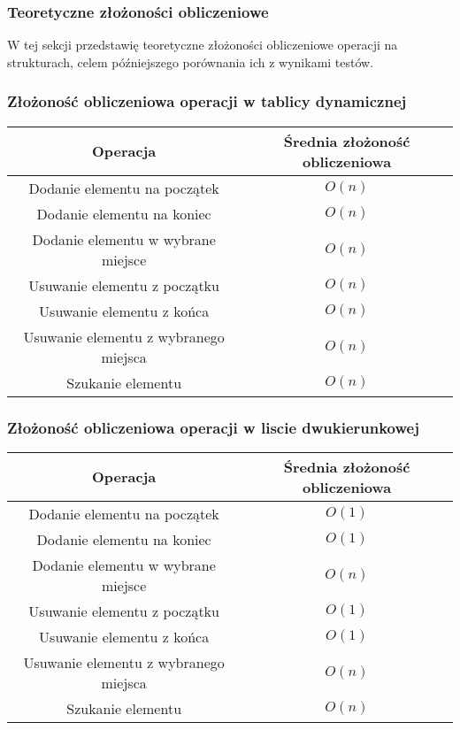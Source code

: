 \documentclass{article}
\begin{document}
        \subsubsection{Teoretyczne złożoności obliczeniowe}
        W tej sekcji przedstawię teoretyczne złożoności obliczeniowe operacji na strukturach, celem późniejszego porównania ich z wynikami testów.
        \subsubsection{Złożoność obliczeniowa operacji w tablicy dynamicznej}
        \begin{center}    
            \begin{tabular}[H]{| c | c |}
                \hline
                Operacja & Średnia złożoność obliczeniowa \\ \hline \hline
                Dodanie elementu na początek & $O(n)$ \\ \hline
                Dodanie elementu na koniec & $O(n)$ \\ \hline
                Dodanie elementu w wybrane miejsce & $O(n)$ \\ \hline
                Usuwanie elementu z początku & $O(n)$ \\ \hline
                Usuwanie elementu z końca & $O(n)$ \\ \hline
                Usuwanie elementu z wybranego miejsca & $O(n)$ \\ \hline
                Szukanie elementu & $O(n)$ \\ \hline
            \end{tabular}
        \end{center}

        \subsubsection{Złożoność obliczeniowa operacji w liscie dwukierunkowej}
        \begin{center}    
            \begin{tabular}[H]{| c | c |}
                \hline
                Operacja & Średnia złożoność obliczeniowa \\ \hline \hline
                Dodanie elementu na początek & $O(1)$ \\ \hline
                Dodanie elementu na koniec & $O(1)$ \\ \hline
                Dodanie elementu w wybrane miejsce & $O(n)$ \\ \hline
                Usuwanie elementu z początku & $O(1)$ \\ \hline
                Usuwanie elementu z końca & $O(1)$ \\ \hline
                Usuwanie elementu z wybranego miejsca & $O(n)$ \\ \hline
                Szukanie elementu & $O(n)$ \\ \hline
            \end{tabular}
        \end{center}
\end{document}
